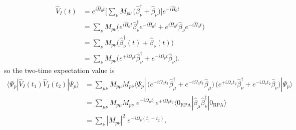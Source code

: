 \begin{align}
\hat{V}_I(t)
&= e^{i\hat{H}_0 t}\Big[\sum_\nu M_{p\nu}\,\big(\hat{\beta}_\nu^\dagger + \hat{\beta}_\nu\big)\Big]e^{-i\hat{H}_0 t}\\
&= \sum_\nu M_{p\nu}\Big(
e^{i\hat{H}_0 t}\hat{\beta}_\nu^\dagger e^{-i\hat{H}_0 t}
+ e^{i\hat{H}_0 t}\hat{\beta}_\nu e^{-i\hat{H}_0 t}
\Big)\\
&= \sum_\nu M_{p\nu}\Big(
\hat{\beta}_\nu^\dagger (t) + \hat{\beta}_\nu(t)
\Big)\\
&= \sum_\nu M_{p\nu}\big(
e^{+i\Omega_\nu t}\hat{\beta}_\nu^\dagger
+ e^{-i\Omega_\nu t}\hat{\beta}_\nu
\big).
\end{align}
so the two-time expectation value is
\begin{align}
\langle \Psi_p|\hat{V}_I(t_1)\hat{V}_I(t_2)|\Psi_p\rangle
&= \sum_{\mu\nu} M_{p\mu} M_{p\nu}
\langle \Psi_p|\,\big(e^{+i\Omega_\mu t_1}\hat{\beta}_\mu^\dagger + e^{-i\Omega_\mu t_1}\hat{\beta}_\mu\big)\,
\big(e^{+i\Omega_\nu t_2}\hat{\beta}_\nu^\dagger + e^{-i\Omega_\nu t_2}\hat{\beta}_\nu\big)
|\Psi_p\rangle\\
&= \sum_{\mu\nu} M_{p\mu} M_{p\nu}\;
e^{-i\Omega_\mu t_1}e^{+i\Omega_\nu t_2}
\langle 0_{\text{RPA}}|\hat{\beta}_\mu \hat{\beta}_\nu^\dagger|0_{\text{RPA}}\rangle\\
&= \sum_{\nu} |M_{p\nu}|^2\;e^{-i\Omega_\nu (t_1-t_2)}.
\end{align}
